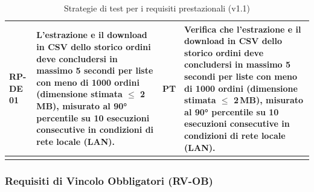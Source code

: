 \documentclass[a4paper,11pt,oneside]{scrartcl}
\begin{document}
\begin{longtable}{|p{1.5cm}|p{5.5cm}|p{1.8cm}|p{5cm}|}
RP-DE 01 & L'estrazione e il download in CSV dello storico ordini deve concludersi in massimo 5 secondi per liste con meno di 1000 ordini (dimensione stimata $\leq$ 2\,MB), misurato al 90° percentile su 10 esecuzioni consecutive in condizioni di rete locale (LAN). & PT & Verifica che l'estrazione e il download in CSV dello storico ordini deve concludersi in massimo 5 secondi per liste con meno di 1000 ordini (dimensione stimata $\leq$ 2\,MB), misurato al 90° percentile su 10 esecuzioni consecutive in condizioni di rete locale (LAN). \\ \hline
\caption{Strategie di test per i requisiti prestazionali (v1.1)}
\end{longtable}

\newpage
\subsubsection{Requisiti di Vincolo Obbligatori (RV-OB)}
\end{document}
